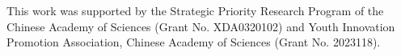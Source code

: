 \documentclass[sigconf,screen,review,anonymous]{acmart}
\begin{document}
\begin{acks}
  This work was supported by the Strategic Priority Research Program of the Chinese Academy of Sciences (Grant No. XDA0320102) and Youth Innovation Promotion Association, Chinese Academy of Sciences (Grant No. 2023118).
\end{acks}



\end{document}

